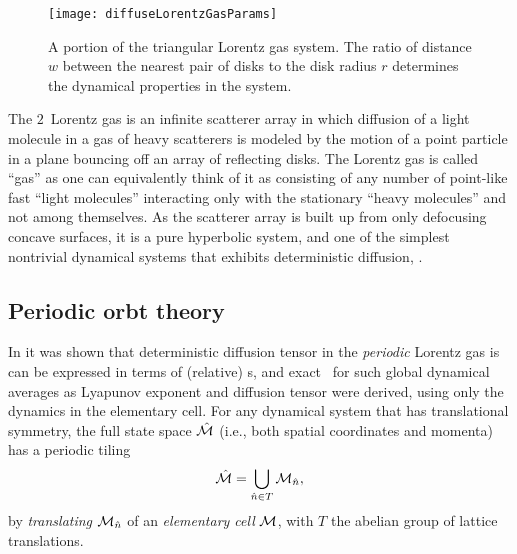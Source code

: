 \documentclass[aps,pre,
                showpacs,
                twocolumn,
                groupedaddress,
                floatfix]{revtex4-1}
\begin{document}
\begin{figure}[htbp]
  \begin{center}

    \texttt{[image: diffuseLorentzGasParams]}

  \end{center}
  \caption[]{\label{fig-schrieberFig1} A portion of the triangular
    Lorentz gas system. The ratio of distance $w$ between the nearest
    pair of disks to the disk radius $r$ determines the dynamical
    properties in the system.}

\end{figure}

The $2$\dmn\ Lorentz gas is an infinite scatterer array in which
diffusion of a light molecule in a gas of heavy scatterers is modeled
by the motion of a point particle in a plane bouncing off an array of
reflecting disks. The Lorentz gas is called ``gas'' as one can
equivalently think of it as consisting of any number of point-like
fast ``light molecules'' interacting only with the stationary ``heavy
molecules'' and not among themselves.  As the scatterer array is built
up from only defocusing concave surfaces, it is a pure hyperbolic
system, and one of the simplest nontrivial dynamical systems that
exhibits deterministic diffusion, .


\subsection{Periodic orbt theory}


In  it was shown that
deterministic diffusion tensor in the {\em periodic} Lorentz gas is
can be expressed in terms of (relative) \po s, and exact
\cycForm\ for such global dynamical averages
as Lyapunov exponent and diffusion tensor were derived, using only
the dynamics in
the elementary cell. For any dynamical system that has translational
symmetry, the full state space $\hat {{\cal M}}$ (i.e., both spatial coordinates
and momenta) has a periodic tiling \[\hat {{\cal M}}=\bigcup_{ \hat n \in T}
{\cal M}_{\hat n},\] by {\em translating} ${\cal M}_{\hat n}$ of an {\em elementary
  cell} ${\cal M}$, with $T$ the abelian group of lattice translations.
\end{document}

